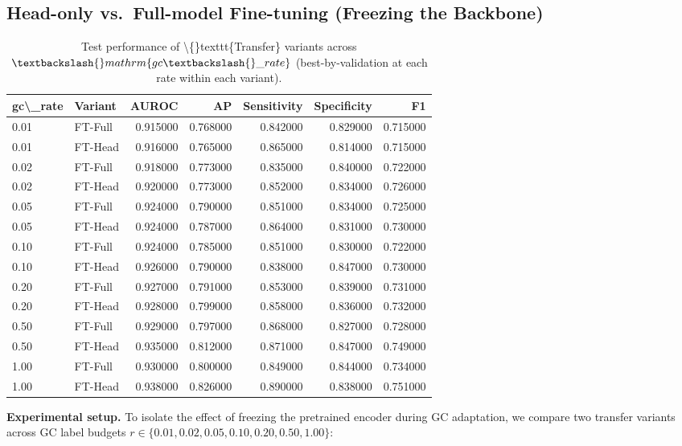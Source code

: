 \documentclass[diagnostics,article,submit,pdftex,moreauthors]{Definitions/mdpi}
\begin{document}
\subsection{Head-only vs.\ Full-model Fine-tuning (Freezing the Backbone)}
\begin{table}[t]
\centering
\small
\begin{tabular}{llrrrrr}
\toprule
gc\textbackslash \_rate & Variant & AUROC & AP & Sensitivity & Specificity & F1 \\
\midrule
0.01 & FT-Full & 0.915000 & 0.768000 & 0.842000 & 0.829000 & 0.715000 \\
0.01 & FT-Head & 0.916000 & 0.765000 & 0.865000 & 0.814000 & 0.715000 \\
0.02 & FT-Full & 0.918000 & 0.773000 & 0.835000 & 0.840000 & 0.722000 \\
0.02 & FT-Head & 0.920000 & 0.773000 & 0.852000 & 0.834000 & 0.726000 \\
0.05 & FT-Full & 0.924000 & 0.790000 & 0.851000 & 0.834000 & 0.725000 \\
0.05 & FT-Head & 0.924000 & 0.787000 & 0.864000 & 0.831000 & 0.730000 \\
0.10 & FT-Full & 0.924000 & 0.785000 & 0.851000 & 0.830000 & 0.722000 \\
0.10 & FT-Head & 0.926000 & 0.790000 & 0.838000 & 0.847000 & 0.730000 \\
0.20 & FT-Full & 0.927000 & 0.791000 & 0.853000 & 0.839000 & 0.731000 \\
0.20 & FT-Head & 0.928000 & 0.799000 & 0.858000 & 0.836000 & 0.732000 \\
0.50 & FT-Full & 0.929000 & 0.797000 & 0.868000 & 0.827000 & 0.728000 \\
0.50 & FT-Head & 0.935000 & 0.812000 & 0.871000 & 0.847000 & 0.749000 \\
1.00 & FT-Full & 0.930000 & 0.800000 & 0.849000 & 0.844000 & 0.734000 \\
1.00 & FT-Head & 0.938000 & 0.826000 & 0.890000 & 0.838000 & 0.751000 \\
\bottomrule
\end{tabular}
\caption{Test performance of \textbackslash\{\}texttt\{Transfer\} variants across $\textbackslash\{\}mathrm\{gc\textbackslash\{\}\_rate\}$ (best-by-validation at each rate within each variant).}
\label{tab:transfer-combo-gc-rate}
\end{table}
\label{subsec:freeze-ablation}
\textbf{Experimental setup.}
To isolate the effect of freezing the pretrained encoder during GC adaptation, we compare two transfer variants across GC label budgets $r\in\{0.01,0.02,0.05,0.10,0.20,0.50,1.00\}$:
\end{document}
